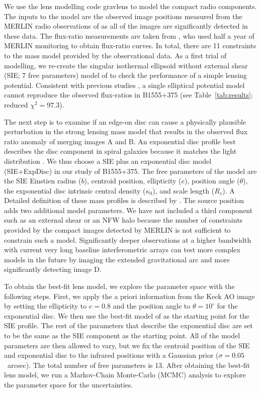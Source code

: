 \documentclass[a4paper,fleqn,usenatbib,useAMS]{mnras}
\begin{document}
We use the lens modelling code {\sc gravlens} \citep{Kee01} to model the compact radio components. The inputs to the model are the observed image positions measured from the MERLIN radio observations of \citet{Marlow99} as all of the images are significantly detected in these data. The flux-ratio measurements are taken from \citet{K03}, who used half a year of MERLIN monitoring to obtain flux-ratio curves. In total, there are 11 constraints to the mass model provided by the observational data. As a first trial of modelling, we re-create the singular isothermal ellipsoid without external shear (SIE; 7 free parameters) model of \citet{Marlow99} to check the performance of a simple lensing potential. Consistent with previous studies \citep{Marlow99,Xu15}, a single elliptical potential model cannot reproduce the observed flux-ratios in B1555+375 (see Table~\ref{tab:results}; reduced $\chi^2 =97.3$). 

The next step is to examine if an edge-on disc can cause a physically plausible perturbation in the strong lensing mass model that results in the observed flux ratio anomaly of  merging images A and B. An exponential disc profile best describes the disc component in spiral galaxies because it matches the light distribution \citep{Kee98}. We thus choose a SIE plus an exponential disc model (SIE+ExpDisc) in our study of B1555+375. The free parameters of the model are the SIE Einstien radius ($b$), centroid position, ellipticity ($e$), position angle ($\theta$), the exponential disc intrinsic central density ($\kappa_0$), and scale length ($R_s$). A Detailed definition of these mass profiles is described by \citet{Kee01}. The source position adds two additional model parameters. We have not included a third component such as an external shear or an NFW halo because the number of constraints provided by the compact images detected by MERLIN is not sufficient to constrain such a model. Significantly deeper observations at a higher bandwidth with current very long baseline interferometric arrays can test more complex models in the future by imaging the extended gravitational arc and more significantly detecting image D. 

To obtain the best-fit lens model, we explore the parameter space with the following steps. First, we apply the a priori information from the Keck AO image by setting the ellipticity to $e=0.8$ and the position angle to $\theta=10^\circ$  for the exponential disc. We then use the best-fit model of \citet{Marlow99} as the starting point for the SIE profile. The rest of the parameters that describe the exponential disc are set to be the same as the SIE component as the starting point. All of the model parameters are then allowed to vary, but we fix the centroid position of the SIE and exponential disc to the infrared positions with a Gaussian prior ($\sigma = 0.05 $~arcsec). The total number of free parameters is 13. After obtaining the best-fit lens model, we run a Markov-Chain Monte-Carlo (MCMC) analysis to explore the parameter space for the uncertainties.
\end{document}
